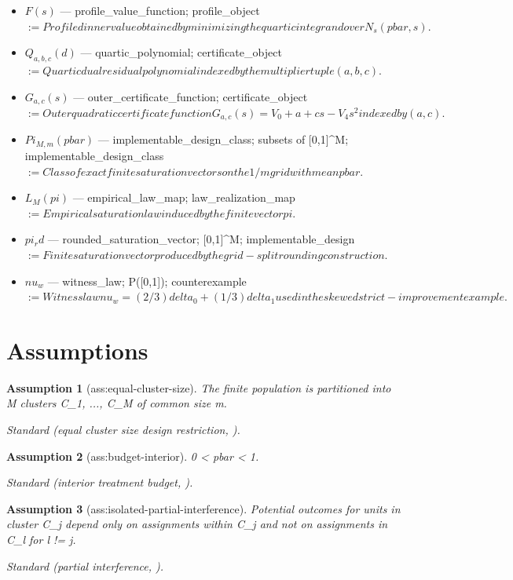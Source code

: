 \documentclass{article}
\newtheorem{assumption}{Assumption}
\begin{document}
\begin{itemize}
  \item $F(s)$ --- profile_value_function; profile_object $:= Profiled inner value obtained by minimizing the quartic integrand over N_s(pbar,s).$
  \item $Q_{a,b,c}(d)$ --- quartic_polynomial; certificate_object $:= Quartic dual residual polynomial indexed by the multiplier tuple (a,b,c).$
  \item $G_{a,c}(s)$ --- outer_certificate_function; certificate_object $:= Outer quadratic certificate function G_{a,c}(s) = V_0 + a + c s - V_4 s^2 indexed by (a,c).$
  \item $Pi_{M,m}(pbar)$ --- implementable_design_class; subsets of [0,1]^M; implementable_design_class $:= Class of exact finite saturation vectors on the 1/m grid with mean pbar.$
  \item $L_M(pi)$ --- empirical_law_map; law_realization_map $:= Empirical saturation law induced by the finite vector pi.$
  \item $pi_rd$ --- rounded_saturation_vector; [0,1]^M; implementable_design $:= Finite saturation vector produced by the grid-split rounding construction.$
  \item $nu_w$ --- witness_law; P([0,1]); counterexample $:= Witness law nu_w = (2/3) delta_0 + (1/3) delta_1 used in the skewed strict-improvement example.$
\end{itemize}

\section{Assumptions}

\begin{assumption}[ass:equal-cluster-size]\label{ass:equal-cluster-size}
The finite population is partitioned into M clusters C_1, ..., C_M of common size m.
\par\smallskip\noindent\emph{Standard} (equal cluster size design restriction, \cite{BairdBohrenMcIntoshOzler2017}).
\end{assumption}

\begin{assumption}[ass:budget-interior]\label{ass:budget-interior}
0 < pbar < 1.
\par\smallskip\noindent\emph{Standard} (interior treatment budget, \cite{HudgensHalloran2008}).
\end{assumption}

\begin{assumption}[ass:isolated-partial-interference]\label{ass:isolated-partial-interference}
Potential outcomes for units in cluster C_j depend only on assignments within C_j and not on assignments in C_l for l != j.
\par\smallskip\noindent\emph{Standard} (partial interference, \cite{HudgensHalloran2008}).
\end{assumption}
\end{document}
